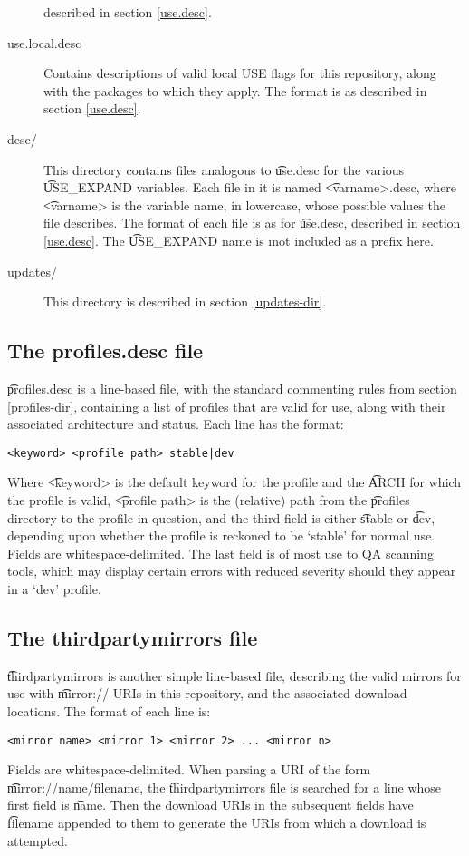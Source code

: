 \begin{description}
    described in section \ref{use.desc}.
\item[use.local.desc] Contains descriptions of valid local USE flags for this repository, along with
    the packages to which they apply. The format is as described in section \ref{use.desc}.
\item[desc/] This directory contains files analogous to \t{use.desc} for the various \t{USE\_EXPAND}
    variables. Each file in it is named \t{<varname>.desc}, where \t{<varname>} is the variable
    name, in lowercase, whose possible values the file describes. The format of each file is as for
    \t{use.desc}, described in section \ref{use.desc}. The \t{USE\_EXPAND} name is \i{not}
    included as a prefix here.
\item[updates/] This directory is described in section \ref{updates-dir}.
\end{description}

\subsection{The profiles.desc file}
\label{profiles.desc}
\t{profiles.desc} is a line-based file, with the standard commenting rules from section
\ref{profiles-dir}, containing a list of profiles that are valid for use, along with their
associated architecture and status. Each line has the format:
\begin{verbatim}
<keyword> <profile path> stable|dev
\end{verbatim}
Where \t{<keyword>} is the default keyword for the profile and the \t{ARCH} for which the profile is
valid, \t{<profile path>} is the (relative) path from the \t{profiles} directory to the profile in
question, and the third field is either \t{stable} or \t{dev}, depending upon whether the profile is
reckoned to be `stable' for normal use. Fields are whitespace-delimited. The last field is of most
use to QA scanning tools, which may display certain errors with reduced severity should they appear
in a `dev' profile.

\subsection{The thirdpartymirrors file}
\label{thirdpartymirrors}
\t{thirdpartymirrors} is another simple line-based file, describing the valid mirrors for use with
\t{mirror://} URIs in this repository, and the associated download locations. The format of each
line is:
\begin{verbatim}
<mirror name> <mirror 1> <mirror 2> ... <mirror n>
\end{verbatim}
Fields are whitespace-delimited. When parsing a URI of the form \t{mirror://name/filename}, the
\t{thirdpartymirrors} file is searched for a line whose first field is \t{name}. Then the download
URIs in the subsequent fields have \t{filename} appended to them to generate the URIs from which a
download is attempted.

